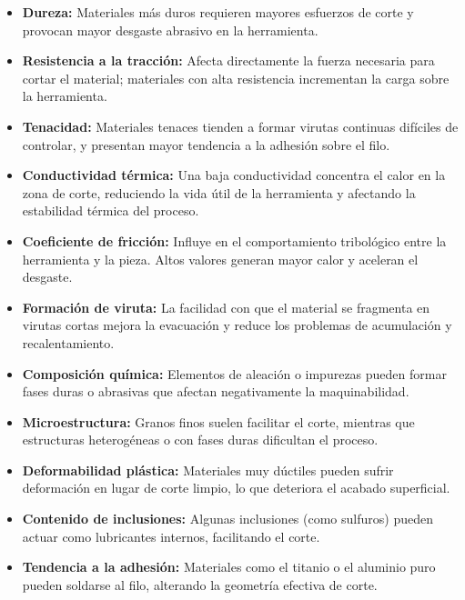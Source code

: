 {\begin{itemize}
	\item \textbf{Dureza:} Materiales más duros requieren mayores esfuerzos de corte y provocan mayor desgaste abrasivo en la herramienta.
	
	\item \textbf{Resistencia a la tracción:} Afecta directamente la fuerza necesaria para cortar el material; materiales con alta resistencia incrementan la carga sobre la herramienta.
	
	\item \textbf{Tenacidad:} Materiales tenaces tienden a formar virutas continuas difíciles de controlar, y presentan mayor tendencia a la adhesión sobre el filo.
	
	\item \textbf{Conductividad térmica:} Una baja conductividad concentra el calor en la zona de corte, reduciendo la vida útil de la herramienta y afectando la estabilidad térmica del proceso.
	
	\item \textbf{Coeficiente de fricción:} Influye en el comportamiento tribológico entre la herramienta y la pieza. Altos valores generan mayor calor y aceleran el desgaste.
	
	\item \textbf{Formación de viruta:} La facilidad con que el material se fragmenta en virutas cortas mejora la evacuación y reduce los problemas de acumulación y recalentamiento.
	
	\item \textbf{Composición química:} Elementos de aleación o impurezas pueden formar fases duras o abrasivas que afectan negativamente la maquinabilidad.
	
	\item \textbf{Microestructura:} Granos finos suelen facilitar el corte, mientras que estructuras heterogéneas o con fases duras dificultan el proceso.
	
	\item \textbf{Deformabilidad plástica:} Materiales muy dúctiles pueden sufrir deformación en lugar de corte limpio, lo que deteriora el acabado superficial.
	
	\item \textbf{Contenido de inclusiones:} Algunas inclusiones (como sulfuros) pueden actuar como lubricantes internos, facilitando el corte.
	
	\item \textbf{Tendencia a la adhesión:} Materiales como el titanio o el aluminio puro pueden soldarse al filo, alterando la geometría efectiva de corte.
\end{itemize}

}
